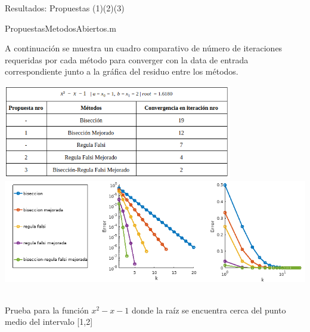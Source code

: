 \documentclass[11pt]{article}
\begin{document}
\begin{center} \large  {Resultados: Propuestas (1)(2)(3)} \end{center}

\begin{tcolorbox}[colframe=blue!35!black, title=Código]
    PropuestasMetodosAbiertos.m
\end{tcolorbox}

A continuación se muestra un cuadro comparativo de número de iteraciones requeridas por cada método para converger con la data de entrada correspondiente junto a la gráfica del residuo entre los métodos.

\begin{center}
    \includegraphics[keepaspectratio, width=10cm]{C1.png}
    \vspace{0.5cm}
    \includegraphics[keepaspectratio, width=14cm]{G1.png}
     \caption \tiny{\\ Prueba para la función $x^2 - x - 1$ donde la raíz se encuentra cerca del punto medio del intervalo [1,2]}
\end{center}  
\vspace{0.75cm}
\end{document}
